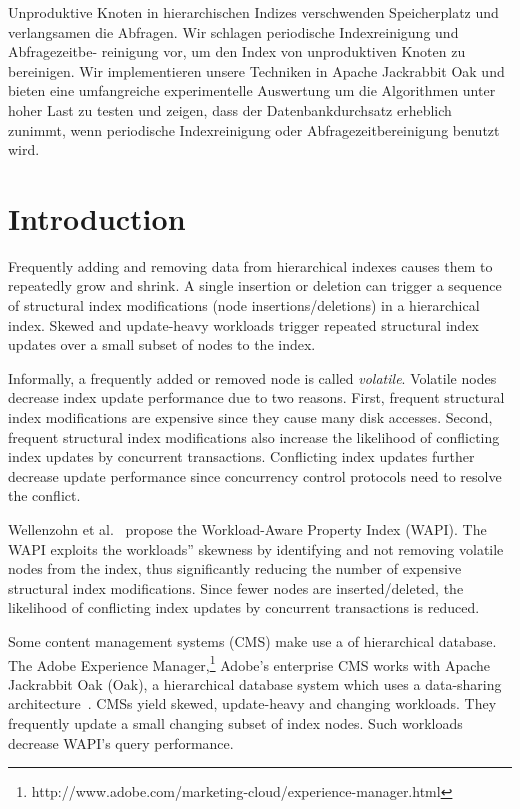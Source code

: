 \documentclass[abstracton,12pt]{scrartcl}
\theoremstyle{definition}
\begin{document}
Unproduktive Knoten in hierarchischen Indizes verschwenden Speicherplatz und
verlangsamen die Abfragen. Wir schlagen periodische Indexreinigung
und Abfragezeitbe- reinigung vor, um den Index von unproduktiven Knoten zu
bereinigen. Wir implementieren
unsere Techniken in Apache Jackrabbit Oak und bieten eine umfangreiche
experimentelle Auswertung um die Algorithmen unter hoher Last zu testen und
zeigen, dass der Datenbankdurchsatz erheblich zunimmt, wenn periodische
Indexreinigung oder Abfragezeitbereinigung benutzt wird.

\newpage
\thispagestyle{empty}

\tableofcontents

\newpage
\thispagestyle{empty}

\listoffigures

\newpage



\section{Introduction}

Frequently adding and removing data from hierarchical indexes causes them to
repeatedly grow and shrink. A single insertion or deletion can trigger a
sequence of structural index modifications (node insertions/deletions) in a
hierarchical index. Skewed and update-heavy workloads trigger repeated
structural index updates over a small subset of nodes to the index.

Informally, a frequently added or removed node is called \textit{volatile}.
Volatile nodes decrease index update performance due to two reasons. First,
frequent structural index modifications are expensive since they cause many disk
accesses. Second, frequent structural index modifications also increase the
likelihood of conflicting index updates by concurrent transactions. Conflicting
index updates further decrease update performance since concurrency control
protocols need to resolve the conflict.

Wellenzohn et al.~\cite{KW17} propose the Workload-Aware Property Index (WAPI).
The WAPI exploits the workloads'' skewness by identifying and not removing
volatile nodes from the index, thus significantly reducing the number of
expensive structural index modifications. Since fewer nodes are
inserted/deleted, the likelihood of conflicting index updates by concurrent
transactions is reduced.

Some content management systems (CMS) make use a of hierarchical database. The Adobe
Experience
Manager,\footnote{http://www.adobe.com/marketing-cloud/experience-manager.html}
Adobe's enterprise CMS works with Apache Jackrabbit Oak
(Oak), a hierarchical database system which uses a data-sharing
architecture~\cite{hyder}. CMSs yield skewed, update-heavy and changing
workloads. They frequently update a small changing subset of index nodes. Such
workloads decrease WAPI's query performance.
\end{document}
